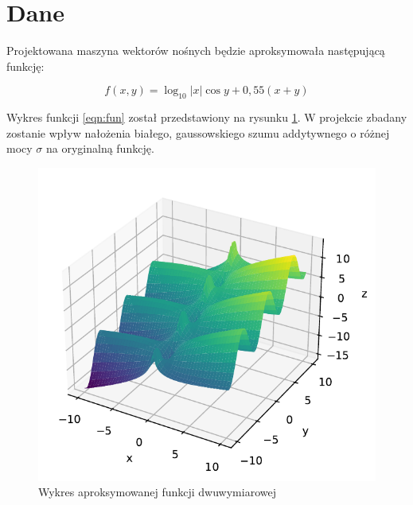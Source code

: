 \documentclass{article}
\begin{document}
\section{Dane}
\label{sec:dane}
Projektowana maszyna wektorów nośnych będzie aproksymowała następującą funkcję:

\begin{equation}
    \label{eqn:fun}
    f(x,y) = \log_{10}{|x|} \cos{y} + 0,55(x+y)
\end{equation}
\smallskip

Wykres funkcji \ref{eqn:fun} został przedstawiony na rysunku \ref{fig:fun}. W projekcie zbadany zostanie wpływ nałożenia białego, gaussowskiego szumu addytywnego o różnej mocy $\sigma$ na oryginalną funkcję.

\begin{figure}
    \centering
    \includegraphics{./figures/fun.pdf}
    \caption{Wykres aproksymowanej funkcji dwuwymiarowej}
    \label{fig:fun}
\end{figure}
\end{document}

